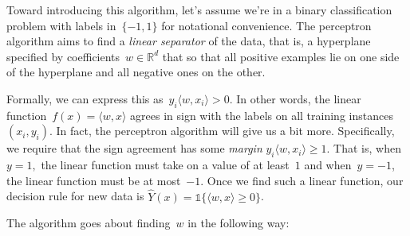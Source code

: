 \documentclass{tufte-book}
\begin{document}
Toward introducing this algorithm, let's assume we're in a binary
classification problem with labels in~\(\{-1,1\}\) for notational
convenience. The perceptron algorithm aims to find a \emph{linear
separator} of the data, that is, a hyperplane
specified by coefficients~\(w\in\mathbb{R}^d\) that so that all positive
examples lie on one side of the hyperplane and all negative ones on the
other.

Formally, we can express this as~\(y_i\langle w, x_i\rangle > 0.\) In
other words, the linear function~\(f(x)=\langle w, x\rangle\) agrees in
sign with the labels on all training instances~\((x_i, y_i)\). In fact,
the perceptron algorithm will give us a bit more. Specifically, we
require that the sign agreement has some \emph{margin}
\(y_i\langle w, x_i\rangle \ge 1.\) That is, when~\(y=1,\) the linear
function must take on a value of at least~\(1\) and when~\(y=-1\), the
linear function must be at most~\(-1\). Once we find such a linear
function, our decision rule for new data is
\(\hat{Y}(x) = \mathbb{1}\{ \langle w, x \rangle \geq 0\}\).

The algorithm goes about finding~\(w\) in the following way:
\end{document}
